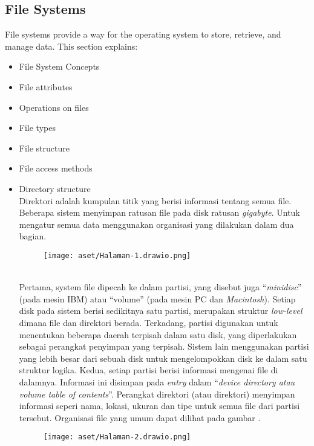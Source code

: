 \documentclass[12pt]{article}
\begin{document}
	\subsection{File Systems}
	File systems provide a way for the operating system to store, retrieve, and manage data. This section explains:
	\begin{itemize}
		\item File System Concepts
		\item File attributes
		\item Operations on files
		\item File types
		\item File structure
		\item File access methods
		\item Directory structure
		\\Direktori adalah kumpulan titik yang berisi informasi tentang semua file. Beberapa sistem menyimpan ratusan file pada disk ratusan \textit{gigabyte}. Untuk mengatur semua data menggunakan organisasi yang dilakukan dalam dua bagian.
		
		\begin{figure}[h!]
			\centering
			\texttt{[image: aset/Halaman-1.drawio.png]}
			
		\end{figure}
		\\Pertama, system file dipecah ke dalam partisi, yang disebut juga “\textit{minidisc}” (pada mesin IBM) atau “volume” (pada mesin PC dan \textit{Macintosh}). Setiap disk pada sistem berisi sedikitnya satu partisi, merupakan struktur \textit{low-level} dimana file dan direktori berada. Terkadang, partisi digunakan untuk menentukan beberapa daerah terpisah dalam satu disk, yang diperlakukan sebagai perangkat penyimpan yang terpisah. Sistem lain menggunakan partisi yang lebih besar dari sebuah disk untuk mengelompokkan disk ke dalam satu struktur logika. Kedua, setiap partisi berisi informasi mengenai file di dalamnya. Informasi ini disimpan pada\textit{ entry }dalam “\textit{device directory atau volume table of contents}”. Perangkat direktori (atau direktori) menyimpan informasi seperi nama, lokasi, ukuran dan tipe untuk semua file dari partisi tersebut. Organisasi file yang umum dapat dilihat pada gambar .
		\begin{figure}[h!]
			\centering
			\texttt{[image: aset/Halaman-2.drawio.png]}
			

\end{figure}
\end{itemize}
\end{document}
